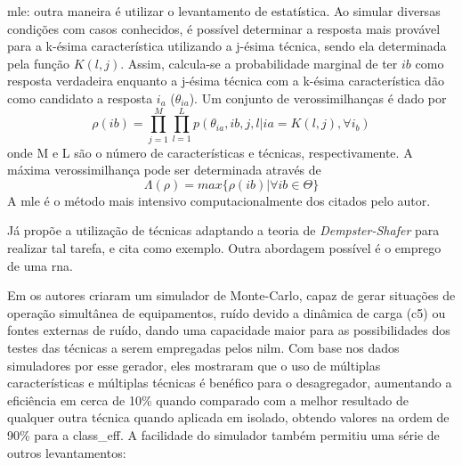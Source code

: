 \begin{enumerate}[label=\textbf{2.\arabic*},wide=\parindent]
\begin{description}
\item \gls{mle}: outra maneira é utilizar o levantamento de
estatística. Ao simular diversas condições com casos conhecidos, é
possível determinar a resposta mais provável para a k-ésima
característica utilizando a j-ésima técnica, sendo ela
determinada pela função $K(l,j)$. Assim, calcula-se a probabilidade
marginal de ter $ib$ como resposta verdadeira enquanto a j-ésima
técnica com a k-ésima característica dão como candidato a resposta
$i_a$ ($\theta_{ia}$). Um conjunto de verossimilhanças é dado por
\begin{equation}
\rho(ib) = \prod_{j=1}^M\prod_{l=1}^L
p(\theta_{ia},ib,j,l|ia=K(l,j),\forall i_b)
\end{equation}
onde M e L são o número de características e técnicas,
respectivamente. A máxima verossimilhança pode ser determinada através de
\begin{equation}
\Lambda(\rho)=max\{\rho(ib)|\forall ib\in\Theta\}
\end{equation}
A \gls{mle} é o método mais intensivo computacionalmente dos citados
pelo autor.
\end{description}

Já \cite{nilm_zeifman_review_2011} propõe a utilização de
técnicas adaptando a teoria de \emph{Dempster-Shafer} para realizar
tal tarefa, e cita \cite{information_fusion_basir_2007_40} como
exemplo. Outra abordagem possível é o emprego de uma \gls{rna}.

Em \cite{nilm_liang_pt2_2010_40} os autores criaram um simulador de
Monte-Carlo, capaz de gerar situações de operação simultânea de equipamentos,
ruído devido a dinâmica de carga (\gls{c5}) ou fontes externas de
ruído, dando uma capacidade maior para as possibilidades dos
testes das técnicas a serem empregadas pelos \gls{nilm}. Com base nos
dados simuladores por esse gerador, eles mostraram que o uso de
múltiplas características e múltiplas técnicas é benéfico para o
desagregador, aumentando a eficiência em cerca de 10\% quando
comparado com a melhor resultado de qualquer outra técnica quando
aplicada em isolado, obtendo valores na ordem de 90\% para a
\acs{class_eff}. A facilidade do simulador também permitiu uma
série de outros levantamentos:


\end{enumerate}
